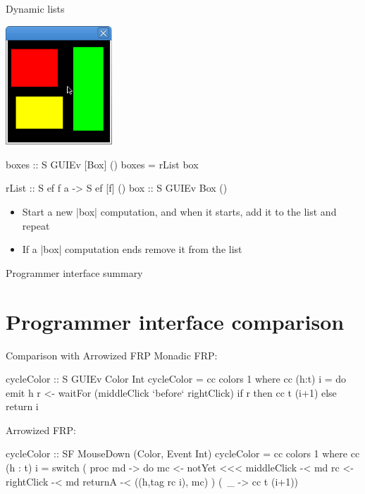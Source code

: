 \documentclass{beamer}
\begin{document}
\begin{frame}{Dynamic lists}
\begin{center}
\includegraphics[width=0.3\textwidth]{05.png}
\end{center}


\begin{code}
boxes :: S GUIEv [Box] ()
boxes = rList box

rList :: S ef f a -> S ef [f] ()
box   :: S GUIEv Box ()
\end{code}

\begin{itemize}
\item Start a new |box| computation, and when it starts, add it to the list and repeat
\item If a |box| computation ends remove it from the list
\end{itemize}
\end{frame}

\begin{frame}{Programmer interface summary}

\end{frame}

\section{Programmer interface comparison}
\begin{frame}{Comparison with Arrowized FRP}
Monadic FRP:
\begin{code}
cycleColor :: S GUIEv Color Int
cycleColor = cc colors 1 where
  cc (h:t) i = do
    emit h
    r <- waitFor (middleClick `before` rightClick)
    if r then cc t (i+1) else return i
\end{code}
Arrowized FRP:
\begin{code}
cycleColor :: SF MouseDown (Color, Event Int)
cycleColor = cc colors 1 where
  cc (h : t) i = switch ( proc md -> do
      mc  <- notYet <<< middleClick  -< md
      rc  <- rightClick              -< md
      returnA -< ((h,tag rc i), mc)
    ) (\ _ -> cc t (i+1))
\end{code}

\end{frame}
\end{document}
